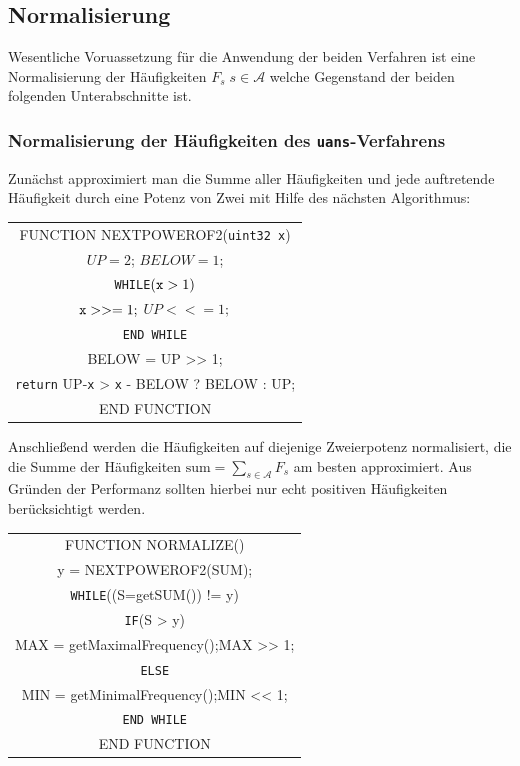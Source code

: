\documentclass[a4paper,12pt]{article}
\newcommand{\A}{\mathcal A}
\newcounter{Algorithmus}
\begin{document}
\subsection{Normalisierung}
Wesentliche Voruassetzung für die Anwendung der beiden Verfahren ist eine Normalisierung der Häufigkeiten $F_{s}\;s\in\A$ welche Gegenstand der beiden folgenden Unterabschnitte ist.

\subsubsection{Normalisierung der Häufigkeiten des {\tt{uans}}-Verfahrens}

Zunächst approximiert man die Summe aller Häufigkeiten und jede auftretende Häufigkeit durch eine Potenz von Zwei mit Hilfe des nächsten Algorithmus:
\par

\begin{center}
\begin{tabular}{c}
FUNCTION NEXTPOWEROF2({\tt{uint32 x}}) 
\\
$UP=2$; $BELOW=1$; 
\\
{\tt{WHILE}}$({\tt{x}} > 1)$ 
\\
${\tt{x}} >>= 1;$ $UP <<= 1;$
\\
{\tt{END {\tt{WHILE}}}}
\\
BELOW = UP >> 1;  
\\
{\tt{return}} UP-{\tt{x}} > {\tt{x}} - BELOW ? BELOW : UP;
\\
END FUNCTION
\end{tabular} 
\end{center}

Anschließend werden die Häufigkeiten auf diejenige Zweierpotenz normalisiert, die die Summe der Häufigkeiten $\text{sum} = \sum_{s \in \A}F_{s}$
 am besten approximiert. Aus Gründen der Performanz sollten hierbei nur echt positiven Häufigkeiten berücksichtigt werden.

\begin{center}
\begin{tabular}{c}
FUNCTION NORMALIZE() 
\\
y = NEXTPOWEROF2(SUM); 
\\
{\tt{WHILE}}((S=getSUM()) != y) 
\\
{\tt{IF}}(S > y)
\\
MAX = getMaximalFrequency();MAX >> 1;
\\
{\tt{ELSE}}
\\
MIN = getMinimalFrequency();MIN << 1;
\\
{\tt{END WHILE}}
\\
END FUNCTION
\end{tabular} 
\end{center}
\end{document}
